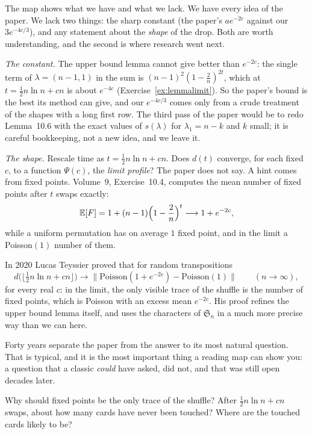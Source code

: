 The map shows what we have and what we lack. We have every idea of the paper. We lack two things: the sharp constant (the paper's $ae^{-2c}$
against our $3e^{-4c/3}$), and any statement about the \emph{shape} of the drop. Both are worth understanding, and the second is where research went
next.

\emph{The constant.} The upper bound lemma cannot give better than $e^{-2c}$: the single term of $\lambda=(n-1,1)$ in the sum is
$(n-1)^2(1-\frac2n)^{2t}$, which at $t=\frac12n\ln n+cn$ is about $e^{-4c}$ (Exercise~\ref{ex:lemmalimit}). So the paper's bound is the best its method can give,
and our $e^{-4c/3}$ comes only from a crude treatment of the shapes with a long first row. The third pass of the paper would be to redo
Lemma~10.6 with the exact values of $s(\lambda)$ for $\lambda_1=n-k$ and $k$ small; it is careful bookkeeping, not a new idea, and we leave it.

\emph{The shape.} Rescale time as $t=\frac12n\ln n+cn$. Does $d(t)$ converge, for each fixed $c$, to a function $\Psi(c)$, the \emph{limit profile}? The
paper does not say. A hint comes from fixed points. Volume~9, Exercise~10.4, computes the mean number of fixed points after $t$ swaps exactly:
\[
\mathbb E[F]=1+(n-1)\Bigl(1-\frac2n\Bigr)^t\longrightarrow1+e^{-2c},
\]
while a uniform permutation has on average $1$ fixed point, and in the limit a Poisson$(1)$ number of them.

\begin{remark}\label{rem:teyssier}
In 2020 Lucas Teyssier proved that for random transpositions
\[
d\bigl(\lfloor\tfrac12n\ln n+cn\rfloor\bigr)\longrightarrow\bigl\|\mathrm{Poisson}(1+e^{-2c})-\mathrm{Poisson}(1)\bigr\|\qquad(n\to\infty),
\]
for every real $c$: in the limit, the only visible trace of the shuffle is the number of fixed points, which is Poisson with an excess mean $e^{-2c}$. His proof
refines the upper bound lemma itself, and uses the characters of $\mathfrak S_n$ in a much more precise way than we can here.
\end{remark}

Forty years separate the paper from the answer to its most natural question. That is typical, and it is the most important thing a reading map
can show you: a question that a classic \emph{could} have asked, did not, and that was still open decades later.

\begin{think}
Why should fixed points be the only trace of the shuffle? After $\frac12n\ln n+cn$ swaps, about how many cards have never been touched? Where are
the touched cards likely to be?
\end{think}

